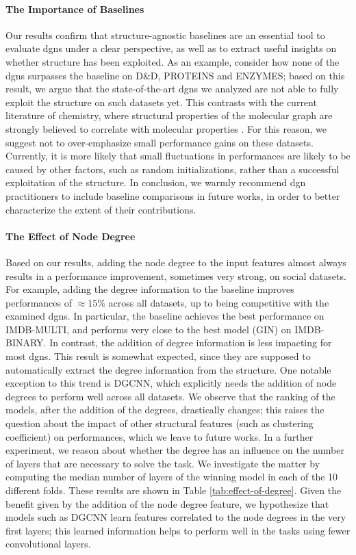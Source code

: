 \paragraph{The Importance of Baselines}
Our results confirm that structure-agnostic baselines are an essential tool to evaluate \glspl{dgn} under a clear perspective, as well as to extract useful insights on whether structure has been exploited. As an example, consider how none of the \glspl{dgn} surpasses the baseline on D\&D, PROTEINS and ENZYMES; based on this result, we argue that the state-of-the-art \glspl{dgn} we analyzed are not able to fully exploit the structure on such datasets yet. This contrasts with the current literature of chemistry, where structural properties of the molecular graph are strongly believed to correlate with molecular properties \citep{vanrossum1965chemical}. For this reason, we suggest not to over-emphasize small performance gains on these datasets. Currently, it is more likely that small fluctuations in performances are likely to be caused by other factors, such as random initializations, rather than a successful exploitation of the structure. In conclusion, we warmly recommend \gls{dgn} practitioners to include baseline comparisons in future works, in order to better characterize the extent of their contributions.



\paragraph{The Effect of Node Degree}
Based on our results, adding the node degree to the input features almost always results in a performance improvement, sometimes very strong, on social datasets. For example, adding the degree information to the baseline improves performances of $\approx 15$\% across all datasets, up to being competitive with the examined \glspl{dgn}. In particular, the baseline achieves the best performance on IMDB-MULTI, and performs very close to the best model (GIN) on IMDB-BINARY. In contrast, the addition of degree information is less impacting for most \glspl{dgn}. This result is somewhat expected, since they are supposed to automatically extract the degree information from the structure. One notable exception to this trend is DGCNN, which explicitly needs the addition of node degrees to perform well across all datasets. We observe that the ranking of the models, after the addition of the degrees, drastically changes; this raises the question about the impact of other structural features (such as clustering coefficient) on performances, which we leave to future works. In a further experiment, we reason about whether the degree has an influence on the number of layers that are necessary to solve the task. We investigate the matter by computing the median number of layers of the winning model in each of the 10 different folds. These results are shown in Table \ref{tab:effect-of-degree}. Given the benefit given by the addition of the node degree feature, we hypothesize that models such as DGCNN learn features correlated to the node degrees in the very first layers; this learned information helps to perform well in the tasks using fewer convolutional layers.

